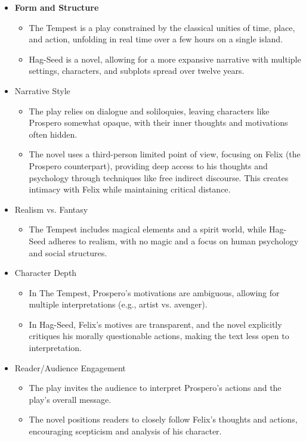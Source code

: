 	\begin{itemize}

		\item \textbf{Form and Structure}

			\begin{itemize}
				\item The Tempest is a play constrained by the classical unities of time, place, and action, unfolding in real time over a few hours on a single island.
				\item Hag-Seed is a novel, allowing for a more expansive narrative with multiple settings, characters, and subplots spread over twelve years.
			\end{itemize}

		\item Narrative Style

			\begin{itemize}
				\item 
				The play relies on dialogue and soliloquies, leaving characters like Prospero somewhat opaque, with their inner thoughts and motivations often hidden.
				\item The novel uses a third-person limited point of view, focusing on Felix (the Prospero counterpart), providing deep access to his thoughts and psychology through techniques like free indirect discourse. This creates intimacy with Felix while maintaining critical distance.
			\end{itemize}

		\item Realism vs. Fantasy

			\begin{itemize}
				\item The Tempest includes magical elements and a spirit world, while Hag-Seed adheres to realism, with no magic and a focus on human psychology and social structures.
			\end{itemize}

		\item Character Depth
			
			\begin{itemize}
				\item In The Tempest, Prospero's motivations are ambiguous, allowing for multiple interpretations (e.g., artist vs. avenger).
				\item In Hag-Seed, Felix's motives are transparent, and the novel explicitly critiques his morally questionable actions, making the text less open to interpretation.
			\end{itemize}

		\item Reader/Audience Engagement
			
			\begin{itemize}
				\item The play invites the audience to interpret Prospero's actions and the play's overall message.
				\item The novel positions readers to closely follow Felix's thoughts and actions, encouraging scepticism and analysis of his character. 
			\end{itemize}
	\end{itemize}	
